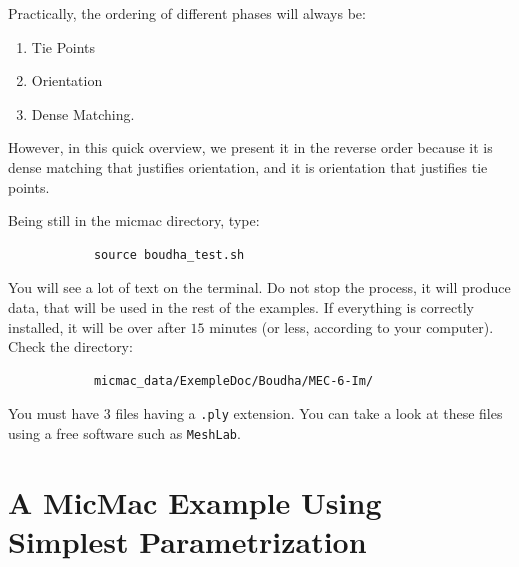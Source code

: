 Practically, the ordering of different phases will always be: %

\begin{enumerate}
  \item Tie Points
  \item Orientation
  \item Dense Matching.
\end{enumerate}

However, in this quick overview, we present it in the reverse
order because it is dense matching that justifies orientation, and it is orientation
that justifies tie points.

Being still in the micmac directory, type:

\begin{center}
\begin{verbatim}
            source boudha_test.sh
\end{verbatim}
\end{center}

You will see a lot of text on the terminal. %
Do not stop the process, it will
produce data, that will be used in the rest of the examples.
If everything is correctly installed, it will be over after $15$ minutes
(or less, according to your computer). Check the directory:

\begin{center}
\begin{verbatim}
            micmac_data/ExempleDoc/Boudha/MEC-6-Im/
\end{verbatim}
\end{center}

You must have $3$ files having a {\tt .ply} extension. You can take a look at these files
using a free software such as {\tt MeshLab}.





\section{A MicMac Example Using Simplest Parametrization}

